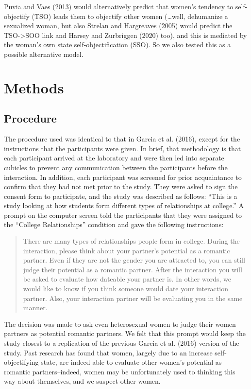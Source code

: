 \documentclass[man]{apa6}
\begin{document}
Puvia and Vaes (2013) would alternatively predict that women's tendency
to self-objectify (TSO) leads them to objectify other women
(\ldots{}well, dehumanize a sexualized woman, but also Strelan and
Hargreaves (2005) would predict the TSO-\textgreater{}SOO link and
Harsey and Zurbriggen (2020) too), and this is mediated by the woman's
own state self-objectification (SSO). So we also tested this as a
possible alternative model.

\section{Methods}\label{methods}

\subsection{Procedure}\label{procedure}

The procedure used was identical to that in Garcia et al. (2016), except
for the instructions that the participants were given. In brief, that
methodology is that each participant arrived at the laboratory and were
then led into separate cubicles to prevent any communication between the
participants before the interaction. In addition, each participant was
screened for prior acquaintance to confirm that they had not met prior
to the study. They were asked to sign the consent form to participate,
and the study was described as follows: \enquote{This is a study looking
at how students form different types of relationships at college.} A
prompt on the computer screen told the participants that they were
assigned to the \enquote{College Relationships} condition and gave the
following instructions:

\begin{quote}
There are many types of relationships people form in college. During the
interaction, please think about your partner's potential as a romantic
partner. Even if they are not the gender you are attracted to, you can
still judge their potential as a romantic partner. After the interaction
you will be asked to evaluate how dateable your partner is. In other
words, we would like to know if you think someone would date your
interaction partner. Also, your interaction partner will be evaluating
you in the same manner.
\end{quote}

The decision was made to ask even heterosexual women to judge their
women partners as potential romantic partners. We felt that this prompt
would keep the study closest to a replication of the previous Garcia et
al. (2016) version of the study. Past research has found that women,
largely due to an increase self-objectifying state, are indeed able to
evaluate other women's potential as romantic partners--indeed, women may
be unfortunately used to thinking this way about themselves, and we
suspect other women.
\end{document}
